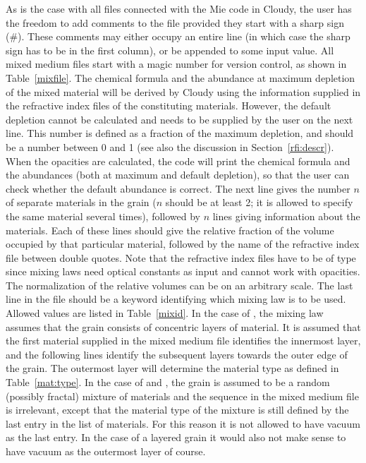 As is the case with all files connected with the Mie code in Cloudy, the user
has the freedom to add comments to the file provided they start with a sharp
sign (\#). These comments may either occupy an entire line (in which case the
sharp sign has to be in the first column), or be appended to some input value.
All mixed medium files start with a magic number for version control, as shown
in Table~\ref{mixfile}.
The chemical formula and the abundance at maximum depletion of the mixed
material will be derived by Cloudy using the information supplied in the
refractive index files of the constituting materials. However, the default
depletion cannot be calculated and needs to be supplied by the user on the
next line. This number is defined as a fraction of the maximum depletion, and
should be a number between 0 and 1 (see also the discussion in
Section~\ref{rfi:descr}). When the opacities are calculated, the code will
print the chemical formula and the abundances (both at maximum and default
depletion), so that the user can check whether the default abundance is
correct. The next line gives the number $n$ of separate materials in the grain
($n$ should be at least 2; it is allowed to specify the same material several
times), followed by $n$ lines giving information about the materials. Each of
these lines should give the relative fraction of the volume occupied by that
particular material, followed by the name of the refractive index file between
double quotes. Note that the refractive index files have to be of type
 since mixing laws need optical constants as input and
cannot work with opacities. The normalization of the relative volumes can be
on an arbitrary scale. The last line in the file should be a keyword
identifying which mixing law is to be used. Allowed values are listed in
Table~\ref{mixid}. In the case of \citet{Farafonov2000}, the mixing law assumes
that the grain consists of concentric layers of material. It is assumed that
the first material supplied in the mixed medium file identifies the innermost
layer, and the following lines identify the subsequent layers towards the
outer edge of the grain. The outermost layer will determine the material type
as defined in Table~\ref{mat:type}. In the case of \citet{Bruggeman1935} and
\citet{Stognienko1995}, the grain is assumed to be a random (possibly
fractal) mixture of materials and the sequence in the mixed medium file is
irrelevant, except that the material type of the mixture is still defined by
the last entry in the list of materials. For this reason it is not allowed to
have vacuum as the last entry. In the case of a layered grain it would also
not make sense to have vacuum as the outermost layer of course.

